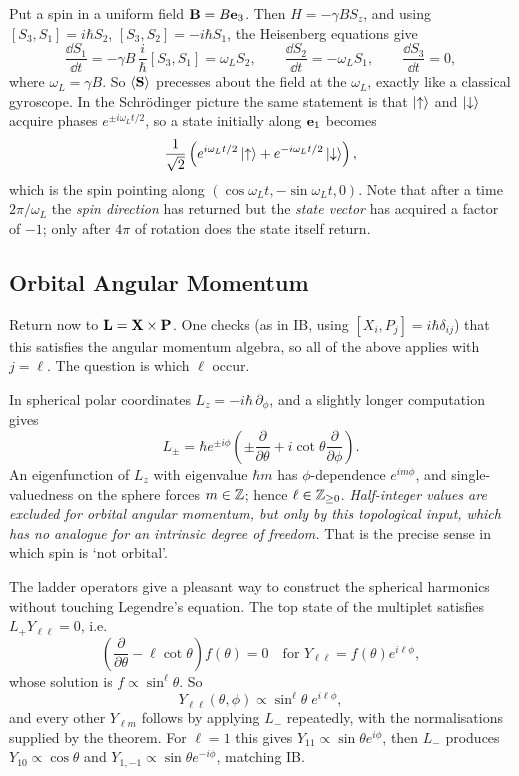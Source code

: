 \documentclass[a4paper]{scrartcl}
\begin{document}
\begin{example}
    Put a spin in a uniform field $\mathbf{B} = B\mathbf{e}_3$. Then $H = -\gamma B S_z$, and using $[S_3,S_1] = i\hbar S_2$, $[S_3,S_2] = -i\hbar S_1$, the Heisenberg equations give
    $$
    \frac{\dd S_1}{\dd t} = -\gamma B\,\frac{i}{\hbar}[S_3, S_1] = \omega_L S_2, \qquad \frac{\dd S_2}{\dd t} = -\omega_L S_1, \qquad \frac{\dd S_3}{\dd t} = 0,
    $$
    where $\omega_L = \gamma B$. So $\expval{\mathbf{S}}$ precesses about the field at the  $\omega_L$, exactly like a classical gyroscope. In the Schr\"odinger picture the same statement is that $\ket\uparrow$ and $\ket\downarrow$ acquire phases $e^{\pm i\omega_L t/2}$, so a state initially along $\mathbf{e}_1$ becomes
    $$
    \frac{1}{\sqrt2}\left( e^{i\omega_L t/2}\ket\uparrow + e^{-i\omega_L t /2}\ket\downarrow \right),
    $$
    which is the spin pointing along $(\cos\omega_L t, -\sin\omega_L t, 0)$. Note that after a time $2\pi/\omega_L$ the \emph{spin direction} has returned but the \emph{state vector} has acquired a factor of $-1$; only after $4\pi$ of rotation does the state itself return.
\end{example}

\subsection{Orbital Angular Momentum}\label{sec:orbital}

Return now to $\mathbf{L} = \mathbf{X} \times \mathbf{P}$. One checks (as in IB, using $[X_i,P_j]=i\hbar\delta_{ij}$) that this satisfies the angular momentum algebra, so all of the above applies with $j = \ell$. The question is which $\ell$ occur.

In spherical polar coordinates $L_z = -i\hbar\,\partial_\phi$, and a slightly longer computation gives
$$
L_\pm = \hbar e^{\pm i \phi}\left( \pm \frac{\partial}{\partial\theta} + i \cot\theta \frac{\partial}{\partial\phi} \right).
$$
An eigenfunction of $L_z$ with eigenvalue $\hbar m$ has $\phi$-dependence $e^{im\phi}$, and single-valuedness on the sphere forces $m \in \mathbb{Z}$; hence $\ell \in \mathbb{Z}_{\geq0}$. \emph{Half-integer values are excluded for orbital angular momentum, but only by this topological input, which has no analogue for an intrinsic degree of freedom.} That is the precise sense in which spin is `not orbital'.

The ladder operators give a pleasant way to construct the spherical harmonics without touching Legendre's equation. The top state of the multiplet satisfies $L_+Y_{\ell\ell} = 0$, i.e.
$$
\left( \frac{\partial}{\partial\theta} - \ell\cot\theta \right) f(\theta) = 0 \quad \text{for } Y_{\ell\ell} = f(\theta)e^{i\ell\phi},
$$
whose solution is $f \propto \sin^\ell\theta$. So
$$
Y_{\ell\ell}(\theta,\phi) \propto \sin^\ell\theta \; e^{i\ell\phi},
$$
and every other $Y_{\ell m}$ follows by applying $L_-$ repeatedly, with the normalisations supplied by the theorem. For $\ell=1$ this gives $Y_{11}\propto \sin\theta e^{i\phi}$, then $L_-$ produces $Y_{10}\propto\cos\theta$ and $Y_{1,-1}\propto \sin\theta e^{-i\phi}$, matching IB.
\end{document}
